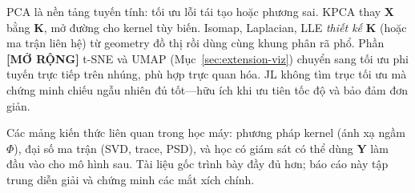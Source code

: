 PCA là nền tảng tuyến tính: tối ưu lỗi tái tạo hoặc phương sai. KPCA thay $\mathbf{X}$ bằng $\mathbf{K}$, mở đường cho kernel tùy biến. Isomap, Laplacian, LLE \emph{thiết kế} $\mathbf{K}$ (hoặc ma trận liên hệ) từ geometry đồ thị rồi dùng cùng khung phân rã phổ. Phần \textbf{[MỞ RỘNG]} t-SNE và UMAP (Mục~\ref{sec:extension-viz}) chuyển sang tối ưu phi tuyến trực tiếp trên nhúng, phù hợp trực quan hóa. JL không tìm trục tối ưu mà chứng minh chiếu ngẫu nhiên đủ tốt---hữu ích khi ưu tiên tốc độ và bảo đảm đơn giản.

Các mảng kiến thức liên quan trong học máy: phương pháp kernel (ánh xạ ngầm $\Phi$), đại số ma trận (SVD, trace, PSD), và học có giám sát có thể dùng $\mathbf{Y}$ làm đầu vào cho mô hình sau. Tài liệu gốc \cite{mohri2018foundations} trình bày đầy đủ hơn; báo cáo này tập trung diễn giải và chứng minh các mắt xích chính.

\FloatBarrier

